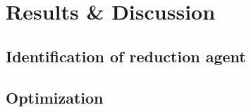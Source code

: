 \section{Results \& Discussion}

\subsection{Identification of reduction agent}

\subsection{Optimization}